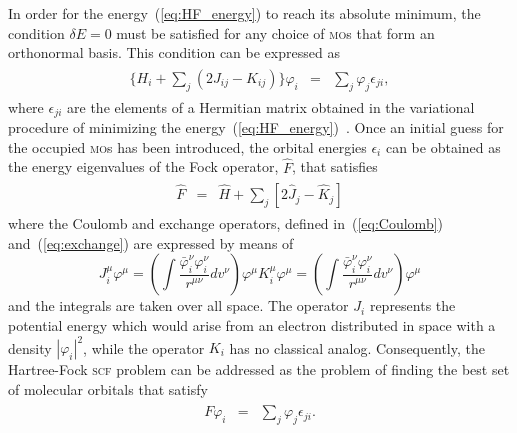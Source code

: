 In order for the energy~(\ref{eq:HF_energy}) to reach its absolute
minimum, the condition $\delta E = 0$ must be satisfied for any choice
of \textsc{mo}s that form an orthonormal basis. This condition can be
expressed as~\cite{Roothaan_HF,Levine_QChem}
%
\begin{eqnarray}
  \begin{split}
    \{H_{i} + \sum\limits_{j} ( 2J_{ij} - K_{ij} ) \} \varphi_{i} & = &
    \sum\limits_{j} \varphi_{j} \epsilon_{ji},
  \end{split}
\label{eq:deltaEzero}
\end{eqnarray}
%
where $\epsilon_{ji}$ are the elements of a Hermitian matrix obtained
in the variational procedure of minimizing the
energy~(\ref{eq:HF_energy})~\cite{Roothaan_HF}. Once an initial guess
for the occupied \textsc{mo}s has been introduced, the orbital
energies $\epsilon_{i}$ can be obtained as the energy eigenvalues of
the Fock operator, $\hat{F}$, that satisfies
%
\begin{eqnarray}
  \begin{split}
    \hat{F} & = & \hat{H} +
    \sum\limits_{j} [ 2\hat{J}_{j} - \hat{K}_{j} ]
  \end{split}
  \label{eq:F_operator}
\end{eqnarray}
%
where the Coulomb and exchange operators, defined
in~(\ref{eq:Coulomb}) and~(\ref{eq:exchange}) are expressed by means of
%
\begin{subequations}
  \begin{equation}\label{eq:one_indxJ}
    J_{i}^{\mu} \varphi^{\mu} = \left( \int
    \frac{\bar\varphi_{i}^{\nu} \varphi_{i}^{\nu}}
         {r^{\mu\nu}} dv^{\nu}
         \right) \varphi^{\mu}
  \end{equation}
  \begin{equation}\label{eq:one_indxK}
    K_{i}^{\mu} \varphi^{\mu} = \left( \int
    \frac{\bar\varphi_{i}^{\nu} \varphi_{i}^{\nu}}
         {r^{\mu\nu}} dv^{\nu}
         \right) \varphi^{\mu}
  \end{equation}
\end{subequations}
%
and the integrals are taken over all space. The operator $J_{i}$
represents the potential energy which would arise from an electron
distributed in space with a density $|\varphi_{i}|^{2}$, while the
operator $K_{i}$ has no classical analog. Consequently, the
Hartree-Fock \textsc{scf} problem can be addressed as the problem of
finding the best set of molecular orbitals that
satisfy~\cite{Roothaan_HF,Levine_QChem}
%
\begin{eqnarray}
  \begin{split}
    F \varphi_{i} & = & \sum\limits_{j} \varphi_{j} \epsilon_{ji}.
  \end{split}
  \label{eq:Fock_operator_problem}
\end{eqnarray}
%

